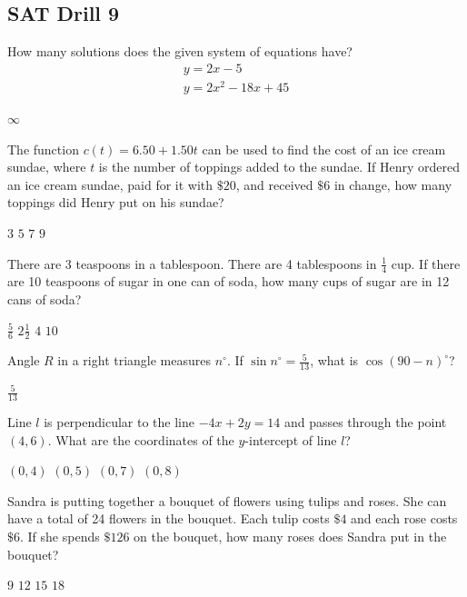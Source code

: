 
\subsection*{SAT Drill 9}

\question[1]
How many solutions does the given system of equations have?
\[
  \begin{gathered}
  y = 2x - 5 \\
  y = 2x^2 - 18x + 45
  \end{gathered}
\]
\begin{choices}
  \choice $\infty$
\end{choices}

\question[1]
The function $c(t) = 6.50 + 1.50t$ can be used to find the cost of an ice cream sundae, where $t$ is the number of toppings added to the sundae. If Henry ordered an ice cream sundae, paid for it with $\$20$, and received $\$6$ in change, how many toppings did Henry put on his sundae?
\begin{choices}
  \choice $3$
  \CorrectChoice $5$
  \choice $7$
  \choice $9$
\end{choices}

\question[1]
There are 3 teaspoons in a tablespoon. There are 4 tablespoons in $\frac{1}{4}$ cup. If there are 10 teaspoons of sugar in one can of soda, how many cups of sugar are in 12 cans of soda?
\begin{choices}
  \choice $\frac{5}{6}$
  \CorrectChoice $2 \frac{1}{2}$
  \choice $4$
  \choice $10$
\end{choices}

\newpage



\question[1]
Angle $R$ in a right triangle measures $n^\circ$. If $\sin n^\circ = \frac{5}{13}$, what is $\cos (90 - n)^\circ$?
\begin{solution}
$\frac{5}{13}$
\end{solution}

\question[1]
Line $l$ is perpendicular to the line $-4x + 2y = 14$ and passes through the point $(4, 6)$. What are the coordinates of the $y$-intercept of line $l$?
\begin{choices}
  \choice $(0, 4)$
  \choice $(0, 5)$
  \choice $(0, 7)$
  \CorrectChoice $(0, 8)$
\end{choices}

\question[1]
Sandra is putting together a bouquet of flowers using tulips and roses. She can have a total of 24 flowers in the bouquet. Each tulip costs $\$4$ and each rose costs $\$6$. If she spends $\$126$ on the bouquet, how many roses does Sandra put in the bouquet?
\begin{choices}
  \choice $9$
  \choice $12$
  \CorrectChoice $15$
  \choice $18$
\end{choices}

